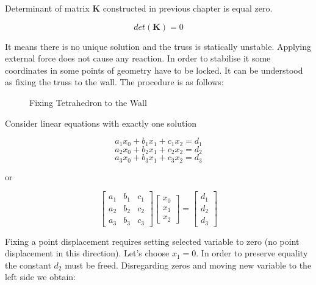 Determinant of matrix $\mathbf{K}$ constructed in previous chapter is equal zero.

\begin{equation}
det(\mathbf{K}) = 0
\end{equation}

It means there is no unique solution and the truss is statically unstable. Applying external force does not cause any reaction. In order to stabilise it some coordinates in some points of geometry have to be locked. It can be understood as fixing the truss to the wall. The procedure is as follows:

\begin{figure}[H]
\centering

\caption{Fixing Tetrahedron to the Wall}
\label{fig:fix:displacement}
\end{figure}

Consider linear equations with exactly one solution

\begin{equation}
a_1 x_0 + b_1 x_1 + c_1 x_2 = d_1
\end{equation}
\begin{equation}
a_2 x_0 + b_2 x_1 + c_2 x_2 = d_2
\end{equation}
\begin{equation}
a_3 x_0 + b_3 x_1 + c_3 x_2 = d_3
\end{equation}

or

\begin{equation}
\begin{bmatrix}
	a_1 & b_1 & c_1 \\
	a_2 & b_2 & c_2 \\
	a_3 & b_3 & c_3
\end{bmatrix}
\begin{bmatrix}
	x_0 \\
	x_1 \\
	x_2
\end{bmatrix}
=
\begin{bmatrix}
	d_1 \\
	d_2 \\
	d_3
\end{bmatrix}
\end{equation}

Fixing a point displacement requires setting selected variable to zero (no point displacement in this direction). Let's choose $x_1=0$. In order to preserve equality the constant $d_2$ must be freed. Disregarding zeros and moving new variable to the left side we obtain:

